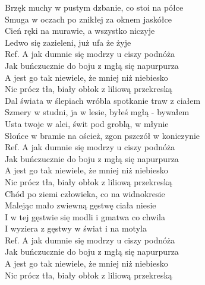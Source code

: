 
Brzęk muchy w pustym dzbanie, co stoi na półce  \\
Smuga w oczach po znikłej za oknem jaskółce \tab{} \\
Cień ręki na murawie, a wszystko niczyje \tab{} \\
Ledwo się zazieleni, już ufa że żyje \tab{}  \\
\hops
Ref. A jak dumnie się modrzy u ciszy podnóża\\
 Jak buńczucznie do boju z mgłą się napurpurza \\
 A jest go tak niewiele, że mniej niż niebiesko \\
 Nic prócz tła, biały obłok z liliową przekreską \\
\hops
Dal świata w ślepiach wróbla spotkanie traw z ciałem \\
Szmery w studni, ja w lesie, byłeś mgłą - bywałem \\
Usta twoje w alei, świt pod groblą, w młynie \\
Słońce w bramie na oścież, zgon pszczół w koniczynie \\
\hops
Ref. A jak dumnie się modrzy u ciszy podnóża\\
 Jak buńczucznie do boju z mgłą się napurpurza \\
 A jest go tak niewiele, że mniej niż niebiesko \\
 Nic prócz tła, biały obłok z liliową przekreską \\
\hops
Chód po ziemi człowieka, co na widnokresie \\
Malejąc mało zwiewną gęstwę ciała niesie \\
I w tej gęstwie się modli i gmatwa co chwila \\
I wyziera z gęstwy w świat i na motyla \\
\hops
Ref. A jak dumnie się modrzy u ciszy podnóża\\
 Jak buńczucznie do boju z mgłą się napurpurza \\
 A jest go tak niewiele, że mniej niż niebiesko \\
 Nic prócz tła, biały obłok z liliową przekreską